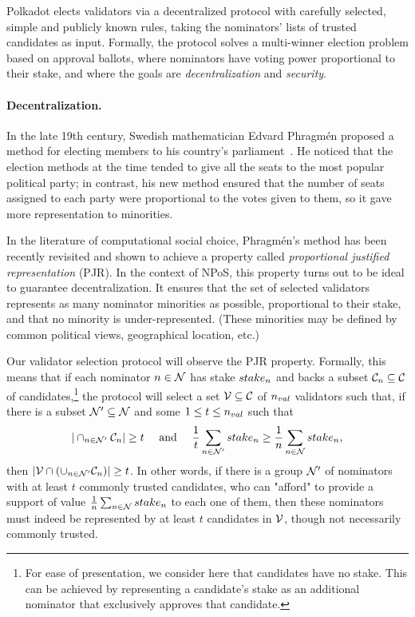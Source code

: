 Polkadot elects validators via a decentralized protocol with carefully selected, simple and publicly known rules,
taking the nominators' lists of trusted candidates as input. Formally, the protocol solves a multi-winner election
problem based on approval ballots, where nominators have voting power proportional to their stake,
and where the goals are \emph{decentralization} and \emph{security}.

\paragraph{Decentralization.} In the late 19th century, Swedish mathematician Edvard Phragm\'{e}n
proposed a method for electing members to his country’s parliament~\cite{brill2017phragmen}.
He noticed that the election methods at the time tended to give all the seats
to the most popular political party; in contrast, his new method ensured that the number of seats
assigned to each party were proportional to the votes given to them, so it gave more representation to minorities.

In the literature of computational social choice, Phragm\'{e}n's method has been recently revisited
and shown to achieve a property called \emph{proportional justified representation} (PJR).
In the context of NPoS, this property turns out to be ideal to guarantee decentralization.
It ensures that the set of selected validators represents as many nominator minorities as possible,
proportional to their stake, and that no minority is under-represented.
(These minorities may be defined by common political views, geographical location, etc.)

Our validator selection protocol will observe the PJR property.
Formally, this means that if each nominator $n \in \mathcal{N}$ has stake $stake_{n}$ and backs a subset
$\mathcal{C}_{n}\subseteq \mathcal{C}$ of candidates,\footnote{For ease of presentation, we consider here
that candidates have no stake. This can be achieved by representing a candidate's stake
as an additional nominator that exclusively approves that candidate.}
the protocol will select a set $\mathcal{V}\subseteq \mathcal{C}$ of $n_{val}$ validators such that, 
if there is a subset $\mathcal{N}'\subseteq \mathcal{N}$ and some $1\leq t\leq n_{val}$ such that
$$|\cap_{n\in \mathcal{N}'} \mathcal{C}_n| \geq t \quad \text{ and } \quad
\frac{1}{t} \sum_{n\in \mathcal{N}'} stake_{n} \geq \frac{1}{n} \sum_{n\in \mathcal{N}} stake_{n},$$
then $|\mathcal{V}\cap (\cup_{n\in\mathcal{N}'} \mathcal{C}_n)| \geq t$.
In other words, if there is a group $\mathcal{N}'$ of nominators with at least $t$ commonly trusted candidates, who can "afford" to provide a support of value $\frac{1}{n} \sum_{n\in \mathcal{N}} stake_{n}$ to each one of them, then these nominators must indeed be represented by at least $t$ candidates in $\mathcal{V}$, though not necessarily commonly trusted.


